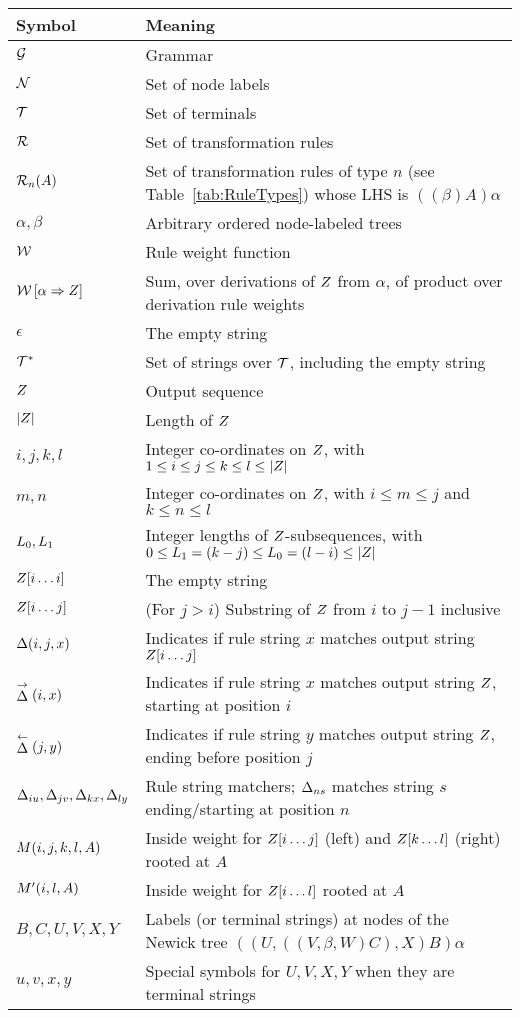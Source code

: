 \documentclass[10pt]{article}
\newcommand{\tabnum}[1]{\ref{tab:#1}}
\newcommand{\tabref}[1]{Table~\tabnum{#1}}
\begin{document}
\noindent
\begin{tabular}{ll}
Symbol & Meaning \\
\hline
${\cal G}$ & Grammar \\
${\cal N}$ & Set of node labels \\
${\cal T}$ & Set of terminals \\
${\cal R}$ & Set of transformation rules \\
${\cal R}_{n}(A)$ & Set of transformation rules of type $n$ (see \tabref{RuleTypes}) whose LHS is $((\beta)A)\alpha$ \\
$\alpha,\beta$ & Arbitrary ordered node-labeled trees \\
${\cal W}$ & Rule weight function \\
${\cal W} \left[ {\alpha} \Rightarrow {Z} \right]$ & Sum, over derivations of $Z$ from $\alpha$, of product over derivation rule weights \\
$\epsilon$ & The empty string \\
${\cal T}^\ast$ & Set of strings over ${\cal T}$, including the empty string \\
$Z$ & Output sequence \\
$|Z|$ & Length of $Z$ \\
$i,j,k,l$ & Integer co-ordinates on $Z$, with $1 \leq i \leq j \leq k \leq l \leq |Z|$ \\
$m,n$ & Integer co-ordinates on $Z$, with $i \leq m \leq j$ and $k \leq n \leq l$ \\
$L_0, L_1$ & Integer lengths of $Z$-subsequences, with $0 \leq L_1 = (k-j) \leq L_0 = (l-i) \leq |Z|$ \\
$Z[i \ldots i]$ & The empty string \\
$Z[i \ldots j]$ & (For $j > i$) Substring of $Z$ from $i$ to $j-1$ inclusive \\
$\Delta(i,j,x)$ & Indicates if rule string $x$ matches output string $Z[i \ldots j]$ \\
$\stackrel{\rightarrow}{\Delta}(i,x)$ & Indicates if rule string $x$ matches output string $Z$, starting at position $i$ \\
$\stackrel{\leftarrow}{\Delta}(j,y)$ & Indicates if rule string $y$ matches output string $Z$, ending before position $j$ \\
$\Delta_{iu},\Delta_{jv},\Delta_{kx},\Delta_{ly}$ & Rule string matchers; $\Delta_{ns}$ matches string $s$ ending/starting at position $n$ \\
$M(i,j,k,l,A)$ & Inside weight for $Z[i \ldots j]$ (left) and $Z[k \ldots l]$ (right) rooted at $A$ \\
$M'(i,l,A)$ & Inside weight for $Z[i \ldots l]$ rooted at $A$ \\
$B,C,U,V,X,Y$ & Labels (or terminal strings) at nodes of the Newick tree $((U,((V,\beta,W)C),X)B)\alpha$ \\
$u,v,x,y$ & Special symbols for $U,V,X,Y$ when they are terminal strings \\
\end{tabular}
\end{document}
